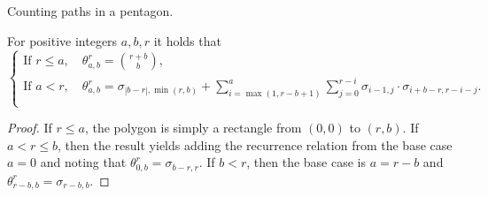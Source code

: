 \begin{subsubsection}{Counting paths in a pentagon.}
 \begin{myprop}
 \label{enum-theta}
 For positive integers $a,b,r$ it holds that
 $$
 \begin{cases}
 \displaystyle\mbox{If }r\leq a,\quad \theta_{a,b}^r = {r+b\choose b},\\
 \displaystyle\mbox{If }a<r,\quad \theta_{a,b}^r = \sigma_{|b-r|,\min(r,b)} + \sum_{i=\max(1,r-b+1)}^a  \sum_{j=0}^{r-i}\sigma_{i-1,j}\cdot \sigma_{i+b-r,r-i-j}.\\
 \end{cases}
 $$
 \end{myprop}
 \begin{proof}
    If $r\leq a$, the polygon is simply a rectangle from $(0,0)$ to $(r,b)$. If $a<r\leq b$, then the result yields adding the recurrence relation from the base case $a=0$ and noting that $\theta_{0,b}^r = \sigma_{b-r,r}$. If $b<r$, then the base case is $a=r-b$ and $\theta_{r-b,b}^r = \sigma_{r-b,b}$.
 \end{proof}
\end{subsubsection}
